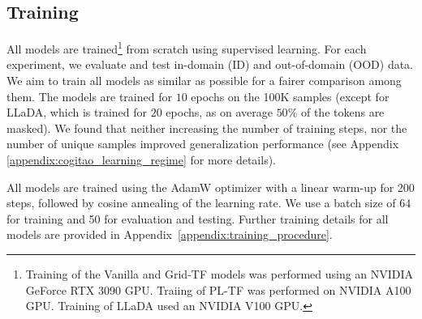 \subsection{Training}
\label{subsec:training}

All models are trained\footnote{Training of the Vanilla and Grid-TF models was performed using an NVIDIA GeForce RTX 3090 GPU. Traiing of PL-TF was performed on NVIDIA A100 GPU. Training of LLaDA used an NVIDIA V100 GPU.} from scratch using supervised learning.
For each experiment, we evaluate and test in-domain (ID) and out-of-domain (OOD) data. We aim to train all models as similar as possible for a fairer comparison among them. The models are trained for $10$ epochs on the 100K samples (except for LLaDA, which is trained for $20$ epochs, as on average $50\%$ of the tokens are masked). We found that neither increasing the number of training steps, nor the number of unique samples improved generalization performance (see Appendix \ref{appendix:cogitao_learning_regime} for more details).

All models are trained using the AdamW optimizer \citep{Loshchilov_AdamW_2019} with a linear warm-up for 200 steps, followed by cosine annealing of the learning rate.
We use a batch size of 64 for training and 50 for evaluation and testing.
Further training details for all models are provided in Appendix~\ref{appendix:training_procedure}.